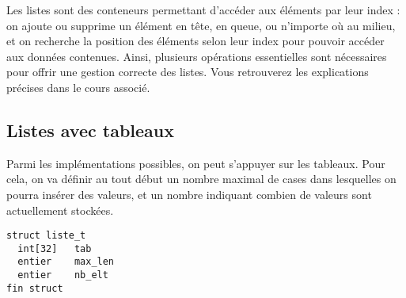 \documentclass[11pt,a4paper]{article}
\begin{document}
\bigskip

Les listes sont des conteneurs permettant d'accéder aux éléments par leur index : on ajoute ou supprime un élément en tête, en queue, ou n'importe où au milieu, et on recherche la position des éléments selon leur index pour pouvoir accéder aux données contenues.
Ainsi, plusieurs opérations essentielles sont nécessaires pour offrir une gestion correcte des listes.
Vous retrouverez les explications précises dans le cours associé.

\bigskip


\subsection{Listes avec tableaux}

\bigskip

Parmi les implémentations possibles, on peut s'appuyer sur les tableaux.
Pour cela, on va définir au tout début un nombre maximal de cases dans lesquelles on pourra insérer des valeurs, et un nombre indiquant combien de valeurs sont actuellement stockées.

\begin{center}
\begin{lstlisting}[style=algorithmique]
struct liste_t
  int[32]   tab
  entier    max_len
  entier    nb_elt
fin struct \end{lstlisting}
\end{center}


\end{document}
